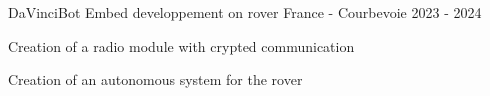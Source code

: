 \begin{cventries}
	\cventry
	{DaVinciBot} %
	{Embed developpement on rover} %
	{France - Courbevoie} %
	{2023 - 2024} %
	{
		\begin{cvitems} %
			\item {Creation of a radio module with crypted communication}
			\item {Creation of an autonomous system for the rover}
		\end{cvitems}
	}
	{}

\end{cventries}
